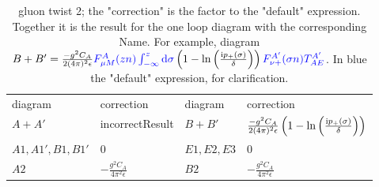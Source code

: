 \begin{table}
	\begin{tabular}{p{2cm}p{6cm}p{2cm}p{6cm}}
		diagram&correction&diagram&correction\\
		$A+A'$ & incorrectResult& $B+B'$ & $\frac{-g^2C_A}{2(4\pi)^2\epsilon}	\left(1-\ln\left(\frac{\text{i} p_{+}(\sigma)}{\delta}\right)\right)$\\
		$A1,A1',B1,B1'$ & $0$& $E1,E2,E3$ & $0$\\
		$A2$ & $-\frac{ g^2 C_A}{4\pi^2 \epsilon} $  & $B2$ & $-\frac{ g^2 C_A}{4\pi^2 \epsilon}$\\
	\end{tabular}
	\caption{gluon twist 2; the "correction" is the factor to the "default" expression. Together it is the result for the one loop diagram with the corresponding Name. For example, diagram $B+B'=\frac{-g^2C_A}{2(4\pi)^2\epsilon}{\color{blue}F_{\mu M}^{A}(zn)\int_{-\infty}^z \text{d}\sigma}	\left(1-\ln\left(\frac{\text{i} p_{+}(\sigma)}{\delta}\right)\right){\color{blue}F_{\nu +}^{A'}(\sigma n)T^{A'}_{AE}}$. In blue the "default" expression, for clarification. }
	\label{Resultsgluontwist2table}
\end{table}


\ifdefined\mainprogram{}
\else

\fi
